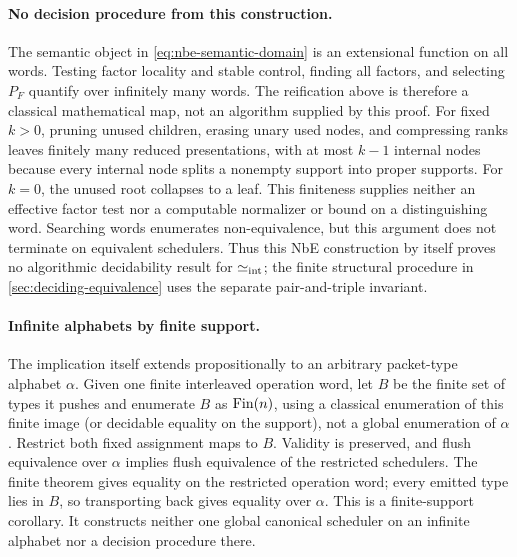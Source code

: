 \paragraph{No decision procedure from this construction.}
The semantic object in \autoref{eq:nbe-semantic-domain} is an extensional function
on all words.  Testing factor locality and stable control, finding all factors,
and selecting \(P_F\) quantify over infinitely many words.  The reification
above is therefore a classical mathematical map, not an algorithm supplied by
this proof.  For fixed \(k>0\), pruning unused children, erasing unary used
nodes, and compressing ranks leaves finitely many reduced presentations, with
at most \(k-1\) internal nodes because every internal node splits a nonempty
support into proper supports.  For \(k=0\), the unused root collapses to a leaf.
This finiteness supplies neither an effective factor test nor a computable
normalizer or bound on a distinguishing word.  Searching words enumerates
non-equivalence, but this argument does not terminate on equivalent
schedulers.  Thus this NbE construction by itself proves no algorithmic
decidability result for \(\mathrel{\simeq_{\mathrm{int}}}\); the finite structural procedure in
\autoref{sec:deciding-equivalence} uses the separate pair-and-triple invariant.

\paragraph{Infinite alphabets by finite support.}
The implication itself extends propositionally to an arbitrary packet-type
alphabet \(\alpha\).  Given one finite interleaved operation word, let \(B\)
be the finite set of types it pushes and enumerate \(B\) as \(\operatorname{Fin}(n)\), using
a classical enumeration of this finite image (or decidable equality on the
support), not a global enumeration of \(\alpha\).
Restrict both fixed assignment maps to \(B\).  Validity is preserved, and
flush equivalence over \(\alpha\) implies flush equivalence of the restricted
schedulers.  The finite theorem gives equality on the restricted operation
word; every emitted type lies in \(B\), so transporting back gives equality
over \(\alpha\).  This is a finite-support corollary.  It constructs neither
one global canonical scheduler on an infinite alphabet nor a decision
procedure there.
